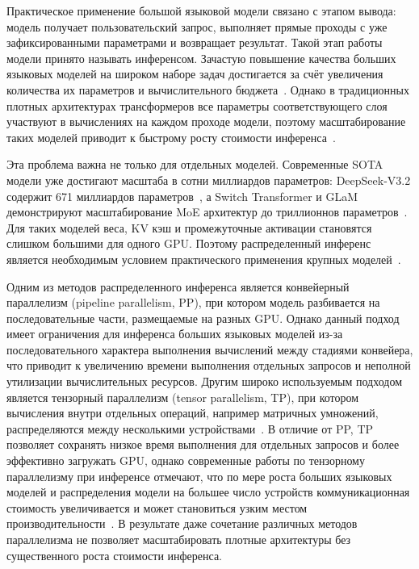 Практическое применение большой языковой модели связано с этапом вывода: модель получает пользовательский запрос, выполняет прямые проходы с уже зафиксированными параметрами и возвращает результат. Такой этап работы модели принято называть инференсом. Зачастую повышение качества больших языковых моделей на широком наборе задач достигается за счёт увеличения количества их параметров и вычислительного бюджета~\cite{kaplan2020scaling,hoffmann2022training}. Однако в традиционных плотных архитектурах трансформеров все параметры соответствующего слоя участвуют в вычислениях на каждом проходе модели, поэтому масштабирование таких моделей приводит к быстрому росту стоимости инференса~\cite{vaswani2017attention,brown2020language}.

Эта проблема важна не только для отдельных моделей. Современные SOTA модели уже достигают масштаба в сотни миллиардов параметров: DeepSeek-V3.2 содержит 671 миллиардов параметров~\cite{deepseek2025v32}, а Switch Transformer и GLaM демонстрируют масштабирование MoE архитектур до триллионнов параметров~\cite{fedus2021switch,du2021glam}. Для таких моделей веса, KV кэш и промежуточные активации становятся слишком большими для одного GPU. Поэтому распределенный инференс является необходимым условием практического применения крупных моделей~\cite{aminabadi2022deepspeed}.

Одним из методов распределенного инференса является конвейерный параллелизм (pipeline parallelism, PP), при котором модель разбивается на последовательные части, размещаемые на разных GPU. Однако данный подход имеет ограничения для инференса больших языковых моделей из-за последовательного характера выполнения вычислений между стадиями конвейера, что приводит к увеличению времени выполнения отдельных запросов и неполной утилизации вычислительных ресурсов. Другим широко используемым подходом является тензорный параллелизм (tensor parallelism, TP), при котором вычисления внутри отдельных операций, например матричных умножений, распределяются между несколькими устройствами~\cite{shoeybi2019megatron,narayanan2021megatron}. В отличие от PP, TP позволяет сохранять низкое время выполнения для отдельных запросов и более эффективно загружать GPU, однако современные работы по тензорному параллелизму при инференсе отмечают, что по мере роста больших языковых моделей и распределения модели на большее число устройств коммуникационная стоимость увеличивается и может становиться узким местом производительности~\cite{dong2024lowbit}. В результате даже сочетание различных методов параллелизма не позволяет масштабировать плотные архитектуры без существенного роста стоимости инференса.


